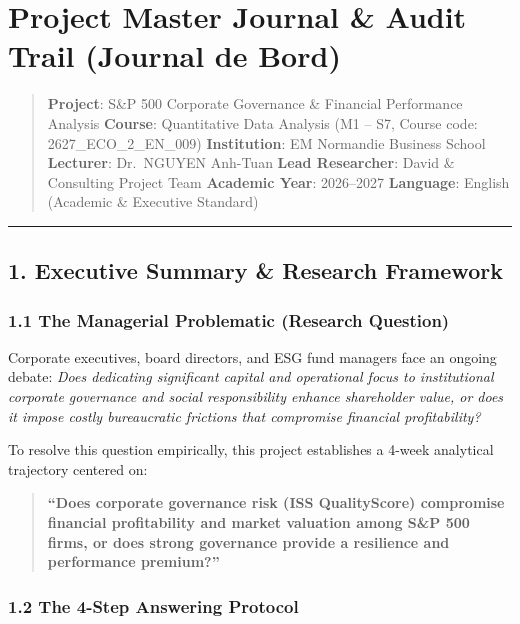 \documentclass[
]{article}
\author{}
\date{}
\begin{document}
\section{Project Master Journal \& Audit Trail (Journal de
Bord)}\label{project-master-journal-audit-trail-journal-de-bord}

\begin{quote}
\textbf{Project}: S\&P 500 Corporate Governance \& Financial Performance
Analysis \textbf{Course}: Quantitative Data Analysis (M1 -- S7, Course
code: 2627\_ECO\_2\_EN\_009) \textbf{Institution}: EM Normandie Business
School \textbf{Lecturer}: Dr.~NGUYEN Anh-Tuan \textbf{Lead Researcher}:
David \& Consulting Project Team \textbf{Academic Year}: 2026--2027
\textbf{Language}: English (Academic \& Executive Standard)
\end{quote}

\begin{center}\rule{0.5\linewidth}{0.5pt}\end{center}

\subsection{1. Executive Summary \& Research
Framework}\label{executive-summary-research-framework}

\subsubsection{1.1 The Managerial Problematic (Research
Question)}\label{the-managerial-problematic-research-question}

Corporate executives, board directors, and ESG fund managers face an
ongoing debate: \emph{Does dedicating significant capital and
operational focus to institutional corporate governance and social
responsibility enhance shareholder value, or does it impose costly
bureaucratic frictions that compromise financial profitability?}

To resolve this question empirically, this project establishes a 4-week
analytical trajectory centered on:

\begin{quote}
\textbf{``Does corporate governance risk (ISS QualityScore) compromise
financial profitability and market valuation among S\&P 500 firms, or
does strong governance provide a resilience and performance premium?''}
\end{quote}

\subsubsection{1.2 The 4-Step Answering
Protocol}\label{the-4-step-answering-protocol}
\end{document}
